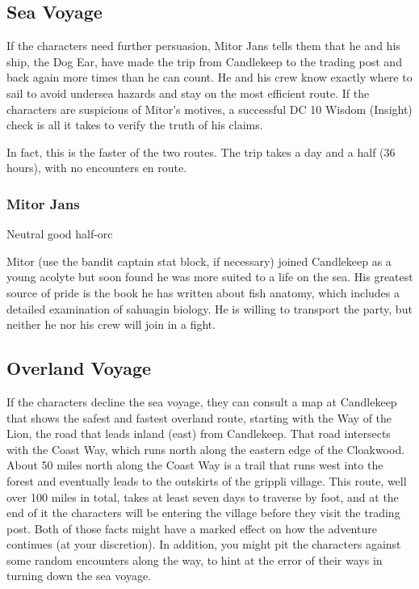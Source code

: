 \documentclass[10pt,a4paper,twoside,bg=print,twocolumn,openany,nodeprecatedcode]{dndbook}
\begin{document}
\subsection{Sea Voyage}
If the characters need further persuasion, Mitor Jans tells them that he and his ship, the Dog Ear, have made the trip from Candlekeep to the trading post and back again more times than he can count. He and his crew know exactly where to sail to avoid undersea hazards and stay on the most efficient route. If the characters are suspicious of Mitor's motives, a successful DC 10 Wisdom (Insight) check is all it takes to verify the truth of his claims.

In fact, this is the faster of the two routes. The trip takes a day and a half (36 hours), with no encounters en route.

\subsubsection{Mitor Jans}
Neutral good half-orc

Mitor (use the bandit captain stat block, if necessary) joined Candlekeep as a young acolyte but soon found he was more suited to a life on the sea. His greatest source of pride is the book he has written about fish anatomy, which includes a detailed examination of sahuagin biology. He is willing to transport the party, but neither he nor his crew will join in a fight.

\subsection{Overland Voyage}
If the characters decline the sea voyage, they can consult a map at Candlekeep that shows the safest and fastest overland route, starting with the Way of the Lion, the road that leads inland (east) from Candlekeep. That road intersects with the Coast Way, which runs north along the eastern edge of the Cloakwood. About 50 miles north along the Coast Way is a trail that runs west into the forest and eventually leads to the outskirts of the grippli village. This route, well over 100 miles in total, takes at least seven days to traverse by foot, and at the end of it the characters will be entering the village before they visit the trading post. Both of those facts might have a marked effect on how the adventure continues (at your discretion). In addition, you might pit the characters against some random encounters along the way, to hint at the error of their ways in turning down the sea voyage.
\end{document}
